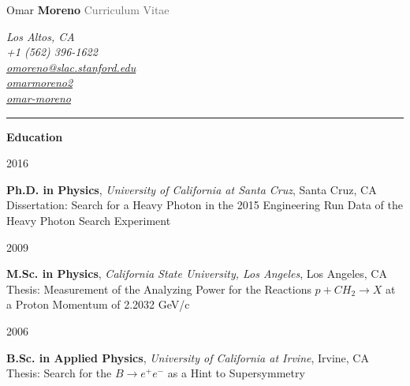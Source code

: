 \documentclass[11pt]{article}
\newcommand{\cvsection}[1] {
    \noindent
    \textcolor{indigodye}{\rule{.15\textwidth}{.1in} \hspace{0.01 \textwidth} \textbf{\Large{#1}}} \newline 
}
\newcommand{\educationentry}[5] { 
    \noindent
    \begin{minipage}[t]{0.15\textwidth} \begin{flushright} #1 \end{flushright} \end{minipage} \hspace{0.01\textwidth}
    \begin{minipage}[t]{0.84\textwidth} 
        \textbf{#2}, \emph{#3}, #4 \newline 
        #5 \newline
    \end{minipage}
}
\begin{document}
    
    \noindent
    \begin{minipage}[c]{0.5\textwidth}
        \begin{flushleft}
            \Huge{Omar \textcolor{indigodye}{\textbf{Moreno}}} \newline
            \Large{\textcolor{dimgray}{Curriculum Vitae}}
        \end{flushleft}
    \end{minipage}
    \begin{minipage}[c]{0.50\textwidth}
        \begin{flushright}
            \color{dimgray} \em
            Los Altos, CA           \\
            \faMobilePhone \hspace{1pt} +1 (562) 396-1622       \\
            \faEnvelope \hspace{1pt} \href{mailto:omoreno@slac.stanford.edu}{omoreno@slac.stanford.edu}          \\
            \faLinkedin \hspace{1pt} \href{https://www.linkedin.com/in/omarmoreno2}{omarmoreno2} \\
            \faGithub \hspace{1pt} \href{https://github.com/omar-moreno}{omar-moreno}            \\
        \end{flushright}
    \end{minipage}

    \cvsection{Education}
        \educationentry{2016}
                       {Ph.D. in Physics}
                       {University of California at Santa Cruz}
                       {Santa Cruz, CA}
                       {Dissertation: Search for a Heavy Photon in the 2015 Engineering Run Data of the Heavy Photon Search Experiment}
        \educationentry{2009}
                       {M.Sc. in Physics}
                       {California State University, Los Angeles}
                       {Los Angeles, CA}
                       {Thesis: Measurement of the Analyzing Power for the Reactions $p + CH_{2} \rightarrow X$ at a Proton Momentum of 2.2032 GeV/c}
        \educationentry{2006}
                       {B.Sc. in Applied Physics}
                       {University of California at Irvine}
                       {Irvine, CA}
                       {Thesis: Search for the $B\rightarrow e^+e^-$ as a Hint to Supersymmetry}
\end{document}
